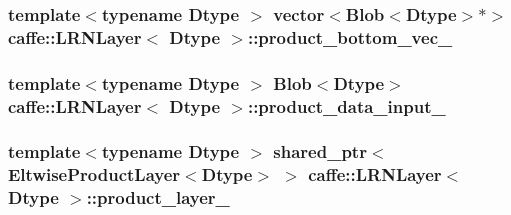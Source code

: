 \hypertarget{classcaffe_1_1_l_r_n_layer_ab1bf581b7cf42b36bdbad8333989a177}{
\subsubsection[{product\+\_\+bottom\+\_\+vec\+\_\+}]{\setlength{\rightskip}{0pt plus 5cm}template$<$typename Dtype $>$ vector$<${\bf Blob}$<$Dtype$>$$\ast$$>$ {\bf caffe\+::\+L\+R\+N\+Layer}$<$ Dtype $>$\+::product\+\_\+bottom\+\_\+vec\+\_\+\hspace{0.3cm}{\ttfamily [protected]}}}\label{classcaffe_1_1_l_r_n_layer_ab1bf581b7cf42b36bdbad8333989a177}
\hypertarget{classcaffe_1_1_l_r_n_layer_ada65115660edfedc23fce996acc42c74}{
\subsubsection[{product\+\_\+data\+\_\+input\+\_\+}]{\setlength{\rightskip}{0pt plus 5cm}template$<$typename Dtype $>$ {\bf Blob}$<$Dtype$>$ {\bf caffe\+::\+L\+R\+N\+Layer}$<$ Dtype $>$\+::product\+\_\+data\+\_\+input\+\_\+\hspace{0.3cm}{\ttfamily [protected]}}}\label{classcaffe_1_1_l_r_n_layer_ada65115660edfedc23fce996acc42c74}
\hypertarget{classcaffe_1_1_l_r_n_layer_aa1b9baeea7f76ad06ec122ce279aeaeb}{
\subsubsection[{product\+\_\+layer\+\_\+}]{\setlength{\rightskip}{0pt plus 5cm}template$<$typename Dtype $>$ shared\+\_\+ptr$<${\bf Eltwise\+Product\+Layer}$<$Dtype$>$ $>$ {\bf caffe\+::\+L\+R\+N\+Layer}$<$ Dtype $>$\+::product\+\_\+layer\+\_\+\hspace{0.3cm}{\ttfamily [protected]}}}\label{classcaffe_1_1_l_r_n_layer_aa1b9baeea7f76ad06ec122ce279aeaeb}
